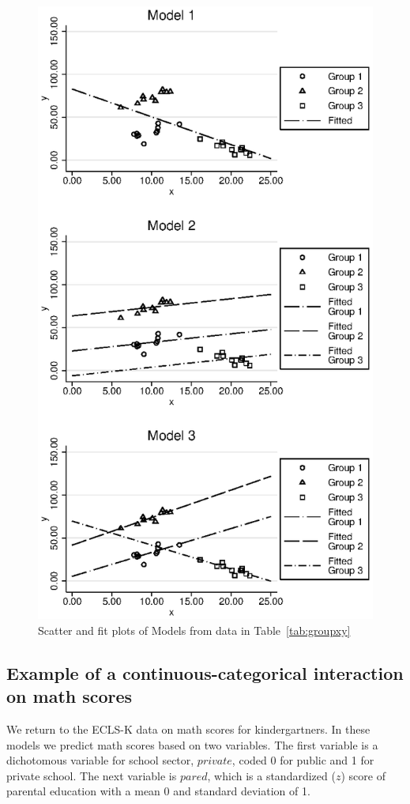 \begin{figure}
   \centering
   \includegraphics[angle=0,
           width=.75\textwidth]{interfit.eps}
   \caption{Scatter and fit plots of Models from data in Table~\ref{tab:groupxy}}
  \label{fig:interfit}
\end{figure}

\subsection{Example of a continuous-categorical interaction on math scores}

We return to the ECLS-K data on math scores for kindergartners. In these models we predict math scores based on two variables. The first variable is a dichotomous variable for school sector, $private$, coded 0 for public and 1 for private school. The next variable is $pared$, which is a standardized ($z$) score of parental education with a mean 0 and standard deviation of 1.

